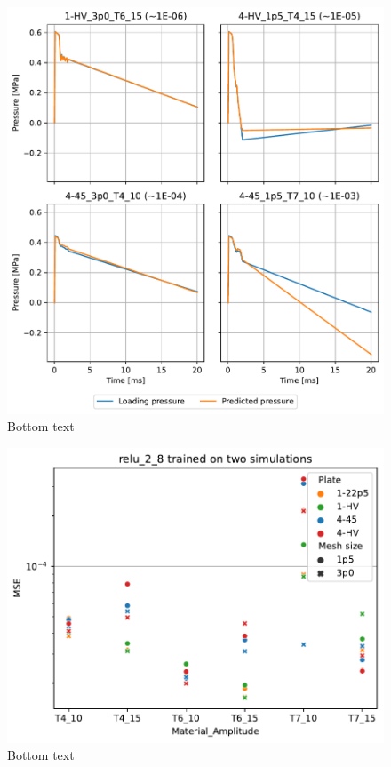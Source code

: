 \begin{figure}
    \centering
    \includegraphics[width=\textwidth]{Chapter/05_results/figures/para1_test.pdf}
    \caption{Bottom text}
    \label{fig:para1_test}
\end{figure}

\begin{figure}
    \centering
    \includegraphics[width=\textwidth]{Chapter/05_results/figures/para2_all.pdf}
    \caption{Bottom text}
    \label{fig:para2_all}
\end{figure}

